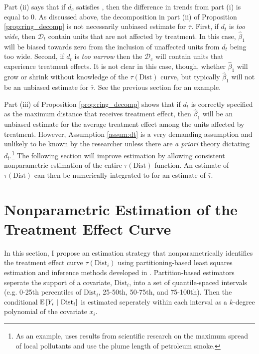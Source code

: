 \documentclass[10pt]{article}
\newcommand{\dist}{\text{Dist}}
\begin{document}
Part (ii) says that if $d_c$ satisfies , then the difference in trends from part (i) is equal to 0. As discussed above, the decomposition in part (ii) of Proposition \ref{prop:ring_decomp} is not necessarily unbiased estimate for $\bar{\tau}$. First, if $d_t$ is \emph{too wide}, then $\mathcal{D}_t$ contain units that are not affected by treatment. In this case, $\hat{\beta}_1$ will be biased towards zero from the inclusion of unaffected units from $d_t$ being too wide. Second, if $d_t$ is \emph{too narrow} then the $\mathcal{D}_c$ will contain units that experience treatment effects. It is not clear in this case, though, whether $\hat{\beta}_1$ will grow or shrink without knowledge of the $\tau(\dist)$ curve, but typically $\hat{\beta}_1$ will not be an unbiased estimate for $\bar{\tau}$. See the previous section for an example.  

Part (iii) of Proposition \ref{prop:ring_decomp} shows that if $d_t$ is correctly specified as the maximum distance that receives treatment effect, then $\hat{\beta}_1$ will be an unbiased estimate for the average treatment effect among the units affected by treatment. However, Assumption \ref{assum:dt} is a very demanding assumption and unlikely to be known by the researcher unless there are \emph{a priori} theory dictating $d_t$.\footnote{As an example, \citet{Currie_Davis_Greenstone_Walker_2015} uses results from scientific research on the maximum spread of local pollutants and \citet{Marcus_2021} use the plume length of petroleum smoke.} The following section will improve estimation by allowing consistent nonparametric estimation of the entire $\tau(\dist)$ function. An estimate of $\tau(\dist)$ can then be numerically integrated to for an estimate of $\bar{\tau}$.



\section{Nonparametric Estimation of the Treatment Effect Curve}\label{sec:lspartition}

In this section, I propose an estimation strategy that nonparametrically identifies the treatment effect curve $\tau(\dist_i)$ using partitioning-based least squares estimation and inference methods developed in \citet{Cattaneo_Crump_Farrell_Feng_2019, Cattaneo_Farrell_Feng_2019}. Partition-based estimators seperate the support of a covariate, $\dist_i$, into a set of quantile-spaced intervals (e.g. 0-25th percentiles of $\dist_i$, 25-50th, 50-75th, and 75-100th). Then the conditional $\condexpec{Y_i}{\dist_i}$ is estimated seperately within each interval as a $k$-degree polynomial of the covariate $x_i$.
\end{document}
